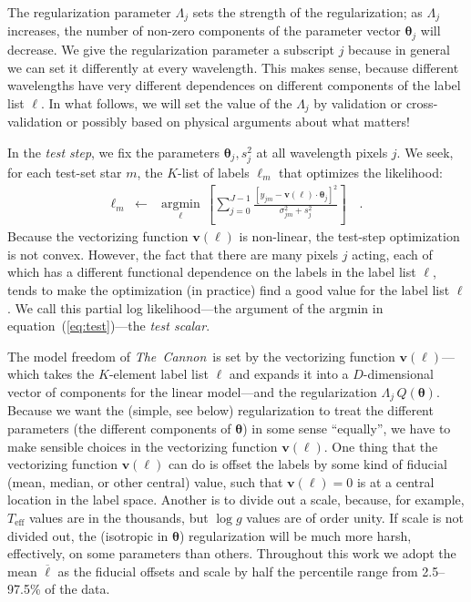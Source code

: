 \documentclass[12pt,preprint]{aastex}
\newcommand{\project}[1]{\textsl{#1}}
\newcommand{\TheCannon}{\project{The~Cannon}}
\newcommand{\logg}{\log g}
\newcommand{\Teff}{T_{\mathrm{eff}}}
\newcommand{\Dvector}[1]{\boldsymbol{#1}}
\newcommand{\vectheta}{\Dvector{\theta}}
\newcommand{\vecv}{\Dvector{v}}
\newcommand{\argmin}[1]{\underset{#1}{\operatorname{argmin}}\,}
\begin{document}
The regularization parameter $\Lambda_j$ sets the strength of the
regularization; as $\Lambda_j$ increases, the number of non-zero
components of the parameter vector $\vectheta_j$ will decrease.
We give the regularization parameter a subscript $j$ because in
general we can set it differently at every wavelength.
This makes sense, because different wavelengths have very different
dependences on different components of the label list $\ell$.
In what follows, we will set the value of the $\Lambda_j$ by
validation or cross-validation or possibly based on physical arguments
about what matters!


In the \emph{test step}, we fix the parameters $\vectheta_j,s^2_j$ at all
wavelength pixels $j$.
We seek, for each test-set star $m$, the $K$-list of labels $\ell_m$
that optimizes the likelihood:
\begin{eqnarray}\label{eq:test}
  \ell_m &\leftarrow& \argmin{\ell}\left[
    \sum_{j=0}^{J-1} \frac{[y_{jm}-\vecv(\ell)\cdot\vectheta_j]^2}{\sigma^2_{jm}+s^2_j}
    \right]
  \quad .
\end{eqnarray}
Because the vectorizing function $\vecv(\ell)$ is non-linear, the
test-step optimization is not convex.
However, the fact that there are many pixels $j$ acting, each of which
has a different functional dependence on the labels in the label list
$\ell$, tends to make the optimization (in practice) find a good value
for the label list $\ell$.
We call this partial log likelihood---the argument of the
argmin in equation~(\ref{eq:test})---the \emph{test scalar}.

The model freedom of \TheCannon\ is set by the vectorizing function
$\vecv(\ell)$---which takes the $K$-element label list $\ell$ and expands
it into a $D$-dimensional vector of components for the linear
model---and the regularization $\Lambda_j\,Q(\vectheta)$.
Because we want the (simple, see below) regularization to treat the
different parameters (the different components of $\vectheta$) in some
sense ``equally'', we have to make sensible choices in the vectorizing
function $\vecv(\ell)$.
One thing that the vectorizing function $\vecv(\ell)$ can do is offset the
labels by some kind of fiducial (mean, median, or other central)
value, such that $\vecv(\ell)=0$ is at a central location in the label
space.
Another is to divide out a scale, because, for example, $\Teff$ values
are in the thousands, but $\logg$ values are of order unity.
If scale is not divided out, the (isotropic in $\vectheta$)
regularization will be much more harsh, effectively, on some
parameters than others.  Throughout this work we adopt the mean $\overline\ell$ as the fiducial offsets and scale by half the percentile range from 2.5--97.5\% of the data.
\end{document}
